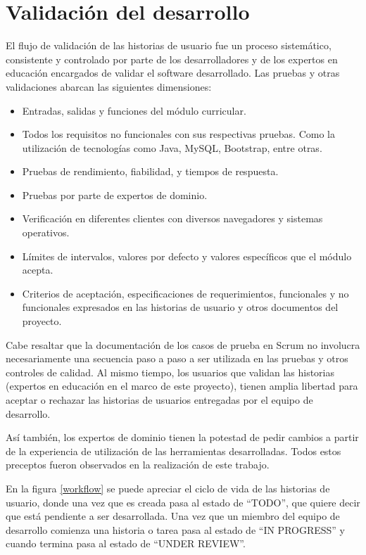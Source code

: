 \section{Validación del desarrollo}

El flujo de validación de las historias de usuario fue un proceso sistemático, consistente y controlado por parte de los desarrolladores y de los expertos en educación encargados de validar el software desarrollado. Las pruebas y otras validaciones abarcan las siguientes dimensiones:
\begin{itemize}
	\item Entradas, salidas y funciones del módulo curricular.
	\item Todos los requisitos no funcionales con sus respectivas pruebas. Como la utilización de tecnologías como Java, MySQL, Bootstrap, entre otras.
	\item Pruebas de rendimiento, fiabilidad, y tiempos de respuesta.
	\item Pruebas por parte de expertos de dominio.
	\item Verificación en diferentes clientes con diversos navegadores y sistemas operativos.
	\item Límites de intervalos, valores por defecto y valores específicos que el módulo acepta.
	\item Criterios de aceptación, especificaciones de requerimientos, funcionales y no funcionales expresados en las historias de usuario y otros documentos del proyecto.
\end{itemize}

Cabe resaltar que la documentación de los casos de prueba en Scrum no involucra necesariamente una secuencia paso a paso a ser utilizada en las pruebas y otros controles de calidad. Al mismo tiempo, los usuarios que validan las historias (expertos en educación en el marco de este proyecto), tienen amplia libertad para aceptar o rechazar las historias de usuarios entregadas por el equipo de desarrollo. 

Así también, los expertos de dominio tienen la potestad de pedir cambios a partir de la experiencia de utilización de las herramientas desarrolladas. Todos estos preceptos fueron observados en la realización de este trabajo.

En la figura \ref{workflow} se puede apreciar el ciclo de vida de las historias de usuario, donde una vez que es creada pasa al estado de \enquote{TODO}, que quiere decir que está pendiente a ser desarrollada. Una vez que un miembro del equipo de desarrollo comienza una historia o tarea pasa al estado de \enquote{IN PROGRESS} y cuando termina pasa al estado de \enquote{UNDER REVIEW}. 

